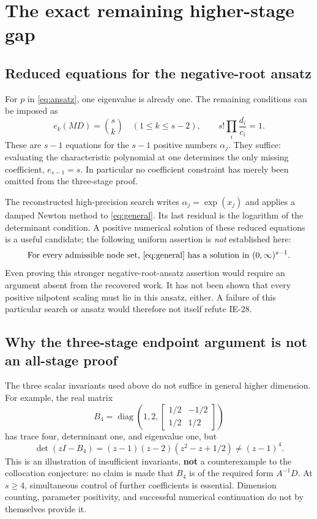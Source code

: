 \documentclass[11pt]{article}
\theoremstyle{remark}
\DeclareMathOperator{\diag}{diag}
\begin{document}
\section{The exact remaining higher-stage gap}
\subsection{Reduced equations for the negative-root ansatz}
For $p$ in \eqref{eq:ansatz}, one eigenvalue is already one. The remaining
conditions can be imposed as
\begin{equation}\label{eq:general}
 e_k(MD)=\binom sk\quad(1\leq k\leq s-2),\qquad
 s!\prod_i\frac{d_i}{c_i}=1.
\end{equation}
These are $s-1$ equations for the $s-1$ positive numbers $\alpha_j$.
They suffice: evaluating the characteristic polynomial at one determines the
only missing coefficient, $e_{s-1}=s$. In particular no coefficient constraint
has merely been omitted from the three-stage proof.

The reconstructed high-precision search writes $\alpha_j=\exp(x_j)$ and applies
a damped Newton method to \eqref{eq:general}. Its last residual is the logarithm
of the determinant condition. A positive numerical solution of these reduced
equations is a useful candidate; the following uniform assertion is \emph{not}
established here:
\[
 \text{For every admissible node set, \eqref{eq:general} has a solution in }
 (0,\infty)^{s-1}.
\]
Even proving this stronger negative-root-ansatz assertion would require an
argument absent from the recovered work. It has not been shown that every
positive nilpotent scaling must lie in this ansatz, either. A failure of this
particular search or ansatz would therefore not itself refute IE-28.

\subsection{Why the three-stage endpoint argument is not an all-stage proof}
The three scalar invariants used above do not suffice in general higher dimension.
For example, the real matrix
\[
 B_4=\diag\!\left(1,2,
  \begin{bmatrix}1/2&-1/2\\1/2&1/2\end{bmatrix}\right)
\]
has trace four, determinant one, and eigenvalue one, but
\[
 \det(zI-B_4)=(z-1)(z-2)(z^2-z+1/2)\ne(z-1)^4.
\]
This is an illustration of insufficient invariants, \textbf{not} a counterexample
to the collocation conjecture: no claim is made that $B_4$ is of the required
form $A^{-1}D$. At $s\geq4$, simultaneous control of further coefficients is
essential. Dimension counting, parameter positivity, and successful numerical
continuation do not by themselves provide it.
\end{document}
